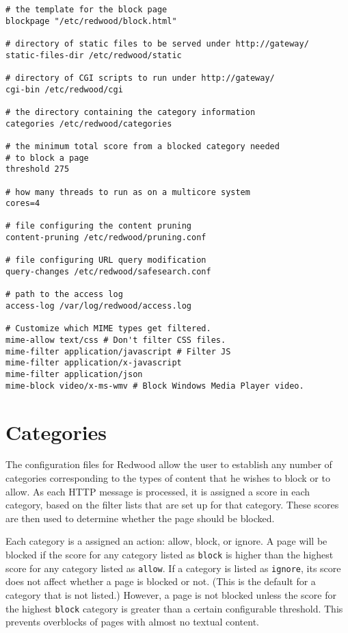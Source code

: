 \documentclass{article}
\begin{document}
\begin{verbatim}
# the template for the block page
blockpage "/etc/redwood/block.html"

# directory of static files to be served under http://gateway/
static-files-dir /etc/redwood/static

# directory of CGI scripts to run under http://gateway/
cgi-bin /etc/redwood/cgi

# the directory containing the category information
categories /etc/redwood/categories

# the minimum total score from a blocked category needed 
# to block a page
threshold 275

# how many threads to run as on a multicore system
cores=4

# file configuring the content pruning
content-pruning /etc/redwood/pruning.conf

# file configuring URL query modification
query-changes /etc/redwood/safesearch.conf

# path to the access log
access-log /var/log/redwood/access.log

# Customize which MIME types get filtered.
mime-allow text/css # Don't filter CSS files.
mime-filter application/javascript # Filter JS
mime-filter application/x-javascript
mime-filter application/json
mime-block video/x-ms-wmv # Block Windows Media Player video.
\end{verbatim}

\section{Categories}

The configuration files for Redwood allow the user to establish any number of categories 
corresponding to the types of content that he wishes to block or to allow. 
As each HTTP message is processed, it is assigned a score in each category, 
based on the filter lists that are set up for that category. 
These scores are then used to determine whether the page should be blocked.

Each category is a assigned an action: allow, block, or ignore. 
A page will be blocked if the score for any category listed as \verb"block" 
is higher than the highest score for any category listed as \verb"allow". 
If a category is listed as \verb"ignore", its score does not affect whether a page 
is blocked or not. (This is the default for a category that is not listed.) 
However, a page is not blocked unless the score for the highest \verb"block" category
is greater than a certain configurable threshold. This prevents overblocks 
of pages with almost no textual content.
\end{document}
